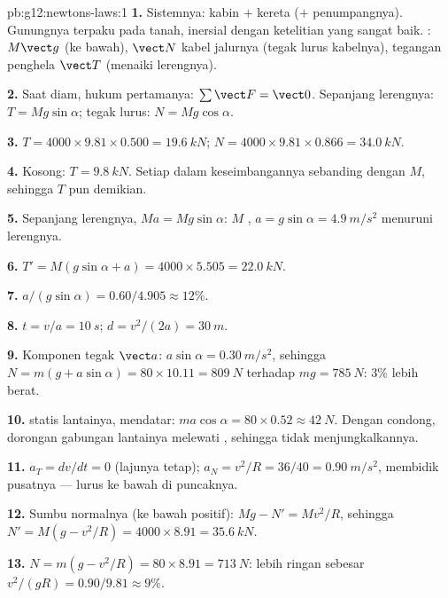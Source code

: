 \begin{solution}{pb:g12:newtons-laws:1}
\textbf{1.} Sistemnya: kabin $+$ kereta ($+$ penumpangnya). Gunungnya
terpaku pada tanah, inersial dengan ketelitian yang sangat baik. :
 $M\vect g$ (ke bawah),  $\vect N$ kabel jalurnya
(tegak lurus kabelnya), tegangan penghela $\vect T$ (menaiki lerengnya).

\textbf{2.} Saat diam, hukum pertamanya: $\sum \vect F = \vect 0$. Sepanjang
lerengnya: $T = Mg\sin\alpha$; tegak lurus: $N = Mg\cos\alpha$.

\textbf{3.} $T = 4000 \times 9.81 \times 0.500 = \qty{19.6}{kN}$;
$N = 4000 \times 9.81 \times 0.866 = \qty{34.0}{kN}$.

\textbf{4.} Kosong: $T = \qty{9.8}{kN}$. Setiap  dalam
keseimbangannya sebanding dengan $M$, sehingga $T$ pun demikian.

\textbf{5.} Sepanjang lerengnya, $Ma = Mg\sin\alpha$: $M$ ,
$a = g\sin\alpha = \qty{4.9}{m/s^2}$ menuruni lerengnya.

\textbf{6.} $T' = M(g\sin\alpha + a) = 4000 \times 5.505 =
\qty{22.0}{kN}$.

\textbf{7.} $a/(g\sin\alpha) = 0.60/4.905 \approx 12\%$.

\textbf{8.} $t = v/a = \qty{10}{s}$; $d = v^2/(2a) = \qty{30}{m}$.

\textbf{9.} Komponen tegak $\vect a$: $a\sin\alpha =
\qty{0.30}{m/s^2}$, sehingga $N = m(g + a\sin\alpha) = 80 \times 10.11 =
\qty{809}{N}$ terhadap $mg = \qty{785}{N}$: $3\%$ lebih berat.

\textbf{10.}  statis lantainya, mendatar:
$ma\cos\alpha = 80 \times 0.52 \approx \qty{42}{N}$. Dengan condong, dorongan
gabungan lantainya melewati , sehingga tidak menjungkalkannya.

\textbf{11.} $a_T = dv/dt = 0$ (lajunya tetap);
$a_N = v^2/R = 36/40 = \qty{0.90}{m/s^2}$, membidik pusatnya ---
lurus ke bawah di puncaknya.

\textbf{12.} Sumbu normalnya (ke bawah positif): $Mg - N' = Mv^2/R$, sehingga
$N' = M(g - v^2/R) = 4000 \times 8.91 = \qty{35.6}{kN}$.

\textbf{13.} $N = m(g - v^2/R) = 80 \times 8.91 = \qty{713}{N}$:
lebih ringan sebesar $v^2/(gR) = 0.90/9.81 \approx 9\%$.


\end{solution}

